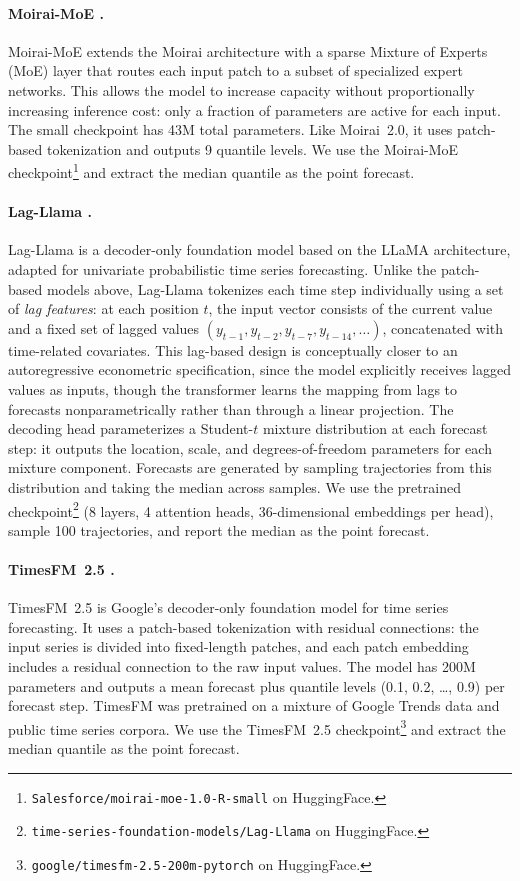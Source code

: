\documentclass[12pt]{article}
\begin{document}
\paragraph{\textbf{Moirai-MoE} \citep{liu2024moiraimoe}.}
Moirai-MoE extends the Moirai architecture with a sparse Mixture of Experts (MoE) layer that routes each input patch to a subset of specialized expert networks. This allows the model to increase capacity without proportionally increasing inference cost: only a fraction of parameters are active for each input. The small checkpoint has 43M total parameters. Like Moirai~2.0, it uses patch-based tokenization and outputs 9 quantile levels. We use the Moirai-MoE checkpoint\footnote{\texttt{Salesforce/moirai-moe-1.0-R-small} on HuggingFace.} and extract the median quantile as the point forecast.

\paragraph{\textbf{Lag-Llama} \citep{rasul2024lagllama}.}
Lag-Llama is a decoder-only foundation model based on the LLaMA architecture, adapted for univariate probabilistic time series forecasting. Unlike the patch-based models above, Lag-Llama tokenizes each time step individually using a set of \emph{lag features}: at each position $t$, the input vector consists of the current value and a fixed set of lagged values $(y_{t-1}, y_{t-2}, y_{t-7}, y_{t-14}, \ldots)$, concatenated with time-related covariates. This lag-based design is conceptually closer to an autoregressive econometric specification, since the model explicitly receives lagged values as inputs, though the transformer learns the mapping from lags to forecasts nonparametrically rather than through a linear projection. The decoding head parameterizes a Student-$t$ mixture distribution at each forecast step: it outputs the location, scale, and degrees-of-freedom parameters for each mixture component. Forecasts are generated by sampling trajectories from this distribution and taking the median across samples. We use the pretrained checkpoint\footnote{\texttt{time-series-foundation-models/Lag-Llama} on HuggingFace.} (8 layers, 4 attention heads, 36-dimensional embeddings per head), sample 100 trajectories, and report the median as the point forecast.

\paragraph{\textbf{TimesFM~2.5} \citep{das2024timesfm}.}
TimesFM~2.5 is Google's decoder-only foundation model for time series forecasting. It uses a patch-based tokenization with residual connections: the input series is divided into fixed-length patches, and each patch embedding includes a residual connection to the raw input values. The model has 200M parameters and outputs a mean forecast plus quantile levels (0.1, 0.2, \ldots, 0.9) per forecast step. TimesFM was pretrained on a mixture of Google Trends data and public time series corpora. We use the TimesFM~2.5 checkpoint\footnote{\texttt{google/timesfm-2.5-200m-pytorch} on HuggingFace.} and extract the median quantile as the point forecast.
\end{document}
